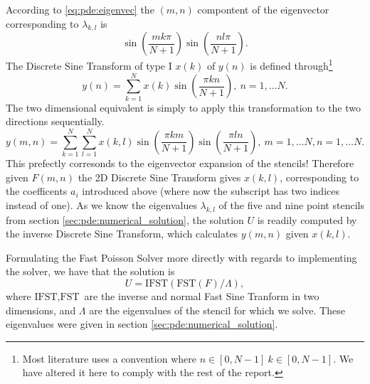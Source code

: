According to \eqref{eq:pde:eigenvec} the $(m, n)$ compontent of the eigenvector corresponding to $\lambda_{k,l}$ is
$$
\sin\left( \frac{m k \pi}{N + 1} \right)
\sin\left( \frac{n l \pi}{N + 1} \right).
$$
The Discrete Sine Transform of type I $x(k)$ of $y(n)$ is defined through\footnote{Most literature uses a convention where $n\in[0, N-1]~ k\in[0, N-1]$. We have altered it here to comply with the rest of the report.} \cite{scipy_dst}
\begin{equation}
  y(n) =
  \sum_{k=1}^{N}
  x(k)
  \sin\left(
  \frac{
    \pi k n
  }{
    N + 1
  }
  \right), ~ n = 1, \dots N.
\end{equation}
The two dimensional equivalent is simply to apply this transformation to the two directions sequentially.
\begin{equation}
  y(m, n) =
  \sum_{k=1}^{N}
  \sum_{l=1}^{N}
  x(k, l)
  \sin\left(
  \frac{
    \pi k m
  }{
    N + 1
  }
  \right)
  \sin\left(
  \frac{
    \pi l n
  }{
    N + 1
  }
  \right), ~ m = 1, \dots N, n = 1, \dots N.
\end{equation}
This prefectly corresonds to the eigenvector expansion of the stencils!
Therefore given $F(m, n)$ the 2D Discrete Sine Transform gives $x(k, l)$, corresponding to the coefficents $a_i$ introduced above (where now the subscript has two indices instead of one).
As we know the eigenvalues $\lambda_{k,l}$ of the five and nine point stencils from section \ref{sec:pde:numerical_solution}, the solution $U$ is readily computed by the inverse Discrete Sine Transform, which calculates $y(m, n)$ given $x(k, l)$.

Formulating the Fast Poisson Solver more directly with regards to implementing the solver, we have that the solution is
$$
U = \text{IFST}(\text{FST}(F) / \Lambda),
$$
where $\text{IFST}, \text{FST}$ are the inverse and normal Fast Sine Tranform in two dimensions, and $\Lambda$ are the eigenvalues of the stencil for which we solve.
These eigenvalues were given in section \ref{sec:pde:numerical_solution}.




